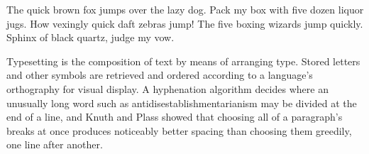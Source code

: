 \documentclass{article}
\begin{document}
The quick brown fox jumps over the lazy dog. Pack my box with five dozen liquor
jugs. How vexingly quick daft zebras jump! The five boxing wizards jump quickly.
Sphinx of black quartz, judge my vow.

Typesetting is the composition of text by means of arranging type. Stored
letters and other symbols are retrieved and ordered according to a language's
orthography for visual display. A hyphenation algorithm decides where an
unusually long word such as antidisestablishmentarianism may be divided at the
end of a line, and Knuth and Plass showed that choosing all of a paragraph's
breaks at once produces noticeably better spacing than choosing them greedily,
one line after another.
\end{document}
